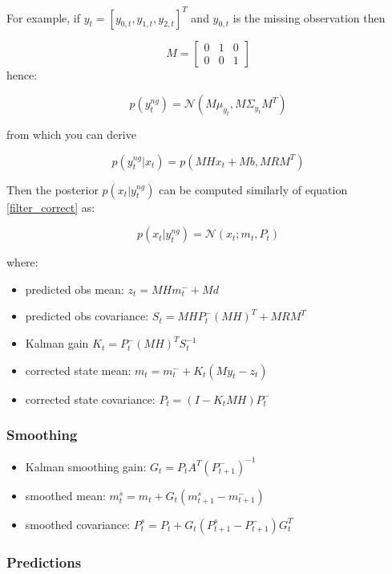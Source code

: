 \documentclass{article}
\let\Oldsubsubsection\subsubsection
\renewcommand{\subsubsection}{\FloatBarrier\Oldsubsubsection}
\begin{document}
For example, if $y_t = [y_{0,t}, y_{1,t}, y_{2,t}]^T$ and $y_{0,t}$ is the missing observation then

$$ M = \left[\begin{array}{ccc}
    0 & 1 & 0 \\
    0 & 0 & 1
\end{array}\right]$$
hence:

$$ p(y^{ng}_t) = \mathcal{N}(M\mu_{y_t},  M\Sigma_{y_t}M^T)$$

from which you can derive

\begin{equation}\label{filter_correct_obs_missing}
    p(y^{ng}_t|x_t) = p(MHx_t + Mb, MRM^T) 
\end{equation}

Then the posterior $p(x_t|y_t^{ng})$ can be computed similarly of equation \ref{filter_correct} as:

\begin{equation}\label{filter_correct_missing}
 p(x_t|y^{ng}_t) = \mathcal{N}(x_t; m_t, P_t)   
\end{equation}
    
where:

\begin{itemize}
    \item predicted obs mean: $z_t = MHm_t^- + Md$   
    \item predicted obs covariance: $S_t = MHP_t^-(MH)^T + MRM^T$
    \item Kalman gain $K_t = P_t^-(MH)^TS_t^{-1}$ 
    \item corrected state mean: $m_t = m_t^- + K_t(My_t - z_t)$ 
    \item corrected state covariance: $P_t = (I-K_tMH)P_t^-$ 
\end{itemize}

\subsubsection{Smoothing}

\begin{itemize}
    \item Kalman smoothing gain: $G_t = P_tA^T(P_{t+1}^-)^{-1}$
    \item smoothed mean: $m_t^s = m_t + G_t(m_{t+1}^s - m_{t+1}^-)$
    \item smoothed covariance: $P_t^s = P_t + G_t(P_{t+1}^s - P_{t+1}^-)G_t^T$
\end{itemize}

\subsubsection{Predictions}
\end{document}
